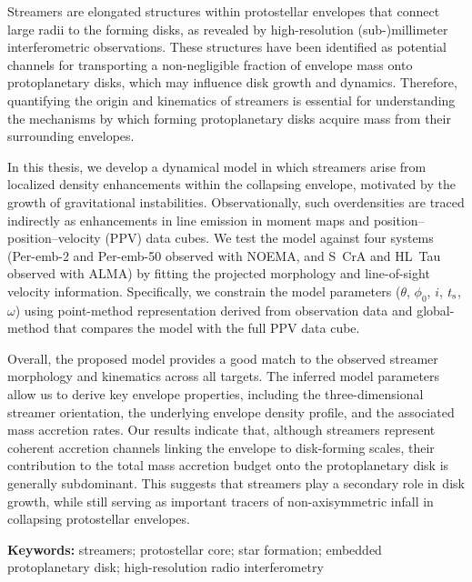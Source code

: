 Streamers are elongated structures within protostellar envelopes that connect large radii to the forming disks, as revealed by high-resolution (sub-)millimeter interferometric observations. These structures have been identified as potential channels for transporting a non-negligible fraction of envelope mass onto protoplanetary disks, which may influence disk growth and dynamics. Therefore, quantifying the origin and kinematics of streamers is essential for understanding the mechanisms by which forming protoplanetary disks acquire mass from their surrounding envelopes.

In this thesis, we develop a dynamical model in which streamers arise from localized density enhancements within the collapsing envelope, motivated by the growth of gravitational instabilities. Observationally, such overdensities are traced indirectly as enhancements in line emission in moment maps and position--position--velocity (PPV) data cubes. We test the model against four systems (Per-emb-2 and Per-emb-50 observed with NOEMA, and S~CrA and HL~Tau observed with ALMA) by fitting the projected morphology and line-of-sight velocity information. Specifically, we constrain the model parameters ($\theta$, $\phi_0$, $i$, $t_{\rm s}$, $\omega$) using point-method representation derived from observation data and global-method that compares the model with the full PPV data cube.

Overall, the proposed model provides a good match to the observed streamer morphology and kinematics across all targets. The inferred model parameters allow us to derive key envelope properties, including the three-dimensional streamer orientation, the underlying envelope density profile, and the associated mass accretion rates. Our results indicate that, although streamers represent coherent accretion channels linking the envelope to disk-forming scales, their contribution to the total mass accretion budget onto the protoplanetary disk is generally subdominant. This suggests that streamers play a secondary role in disk growth, while still serving as important tracers of non-axisymmetric infall in collapsing protostellar envelopes.

\vspace{1em}
\noindent\textbf{Keywords:} streamers; protostellar core; star formation; embedded protoplanetary disk; high-resolution radio interferometry